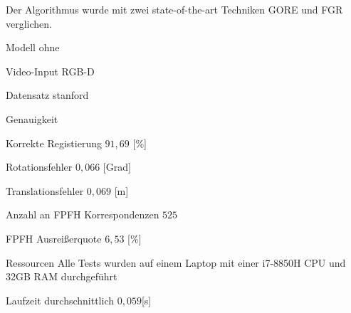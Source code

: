 \documentclass[a4paper, 11pt]{article}
\begin{document}
\begin{multicols*}{2}
    Der Algorithmus wurde mit zwei state-of-the-art Techniken GORE\cite{gore} und FGR\cite{fgr} verglichen.

    \begin{description*}
        \item[Modell] ohne
        \item[Video-Input] RGB-D
        \item[Datensatz] \Gls{stanford}
        \item[Genauigkeit]
        \begin{itemize*}
            \item Korrekte Registierung $91,69$ [\%]
            \item Rotationsfehler $0,066$ [Grad]
            \item Translationsfehler $0,069$ [m]
            \item Anzahl an FPFH\cite{fpfh} Korrespondenzen $525$
            \item FPFH Ausreißerquote $6,53$ [\%]
        \end{itemize*}
        \item[Ressourcen] Alle Tests wurden auf einem Laptop mit einer i7-8850H CPU und 32GB RAM durchgeführt
        \item[Laufzeit] durchschnittlich $0,059$[s]
    \end{description*}


\end{multicols*}
\end{document}
